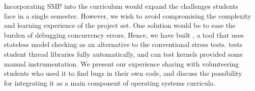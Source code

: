 Incorporating SMP into the \fourten curriculum would expand the challenges students face in a single semester.
However, we wish to avoid compromising the complexity
and learning experience of the project set.
One solution would be to ease the burden of debugging concurrency errors.
Hence, we have built \landslide%
, a tool that uses stateless model checking \cite{verisoft,dpor,chess-icb}
as an alternative to the conventional stress tests.
\landslide tests student thread libraries fully automatically, and can test kernels provided some manual instrumentation.
We present our experience sharing \landslide with volunteering students who used it to find bugs in their own code,
and discuss the possibility for integrating it as a main component of operating systems curricula.

